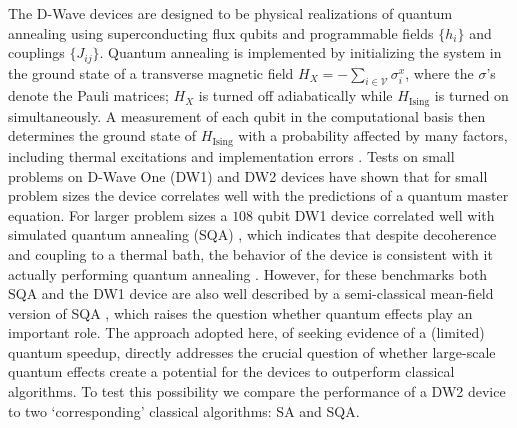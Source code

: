 The D-Wave devices \cite{Harris2010,0953-2048-23-6-065004,berkley2010scalable,Johnson2011} are designed to be physical realizations of quantum annealing using superconducting flux qubits and programmable fields $\{h_i\}$ and couplings $\{J_{ij}\}$. Quantum annealing is implemented by initializing the system in the ground state of a transverse magnetic field $H_X = -\sum_{i\in\mathcal{V}} \sigma_i^x$, where the $\sigma$'s denote the Pauli matrices; $H_X$ is turned off adiabatically while $H_{\mathrm{Ising}}$ is turned on simultaneously. A measurement of each qubit in the computational basis then determines the ground state of $H_{\mathrm{Ising}}$ with a probability affected by many factors, including thermal excitations and implementation errors \cite{ourpaper}. Tests on small problems on D-Wave One (DW1) \cite{Boixo2012} and DW2 devices \cite{Vinci:2014yq} have shown that for small problem sizes the device correlates well with the predictions of a quantum master equation. For larger problem sizes a $108$ qubit DW1 device correlated well with simulated quantum annealing (SQA) \cite{ourpaper}, which indicates that despite decoherence and coupling to a thermal bath, the behavior of the device is consistent with it actually performing quantum annealing \cite{Smolin,comment-SS}. However, for these benchmarks both SQA and the DW1 device are also well described by a semi-classical mean-field version of SQA \cite{SSSV}, which raises the question whether quantum effects play an important role. The approach adopted here, of seeking evidence of a (limited) quantum speedup, directly addresses the crucial question of whether large-scale quantum effects create a potential for the devices to outperform classical algorithms. To test this possibility we compare the performance of a DW2 device to two `corresponding' classical algorithms: SA and SQA.


